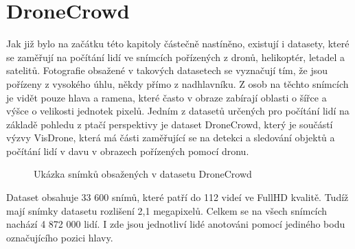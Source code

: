 \section{DroneCrowd}
Jak již bylo na začátku této kapitoly částečně nastíněno, existují i datasety, které se zaměřují na počítání lidí ve snímcích pořízených z dronů, helikoptér, letadel a satelitů.
Fotografie obsažené v takových datasetech se vyznačují tím, že jsou pořízeny z vysokého úhlu, někdy přímo z nadhlavníku.
Z osob na těchto snímcích je vidět pouze hlava a ramena, které často v obraze zabírají oblasti o šířce a výšce o velikosti jednotek pixelů.
Jedním z datasetů určených pro počítání lidí na základě pohledu z ptačí perspektivy je dataset DroneCrowd, který je součástí výzvy VisDrone, která má části zaměřující se na detekci a sledování objektů a počítání lidí v davu v obrazech pořízených pomocí dronu.

\begin{figure}[h!]
	\centering
	\caption{Ukázka snímků obsažených v datasetu DroneCrowd \cite{DroneCrowd}}
	\label{fig:DroneCrowd}
\end{figure}

Dataset obsahuje 33 600 snímů, které patří do 112 videí ve FullHD kvalitě.
Tudíž mají snímky datasetu rozlišení 2,1 megapixelů.
Celkem se na všech snímcích nachází 4 872 000 lidí.
I zde jsou jednotliví lidé anotováni pomocí jediného bodu označujícího pozici hlavy.


